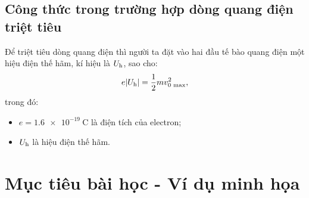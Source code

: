 \subsection{Công thức trong trường hợp dòng quang điện triệt tiêu}

Để triệt tiêu dòng quang điện thì người ta đặt vào hai đầu tế bào quang điện một hiệu điện thế hãm, kí hiệu là $U_\text h$, sao cho:
\begin{equation}
	e |U_\text h|=	\dfrac{1}{2}mv_\text{0 max}^2 ,
\end{equation}
trong đó:
\begin{itemize}
	\item $e=\SI{1.6e-19}{\coulomb}$ là điện tích của electron;
	\item $U_\text h$ là hiệu điện thế hãm.
\end{itemize}


\section{Mục tiêu bài học - Ví dụ minh họa}

